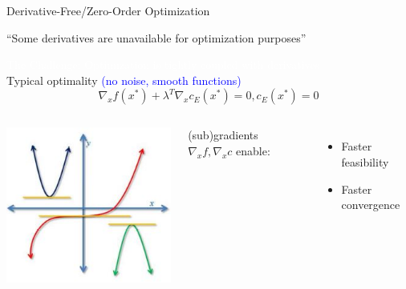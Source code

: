 \documentclass[handout,aspectratio=54]{beamer}
\numberwithin{theorem}{section}
\begin{document}
\begin{frame}{Derivative-Free/Zero-Order Optimization}
\centerline{
“Some derivatives are unavailable for optimization purposes”
}
\vspace{0.1cm} 
\colorbox[rgb]{0.5,0.6,0.7}{\textcolor{white}{The Challenge: Optimization is tightly coupled with derivatives}}\\
\vspace{0.1cm} 
Typical optimality \textcolor{blue}{(no noise, smooth functions)}
\begin{equation*}
\nabla_x f(x^*)+\lambda^T\nabla_x c_E(x^*)=0,c_E(x^*)=0
\end{equation*}

\begin{columns}
\includegraphics[width=\textwidth]{fig/5.jpg}

(sub)gradients $\nabla_x f,\nabla_x c$ enable:

\begin{itemize}
\item Faster feasibility

\item Faster convergence


\end{itemize}
\end{columns}
\end{frame}
\end{document}
